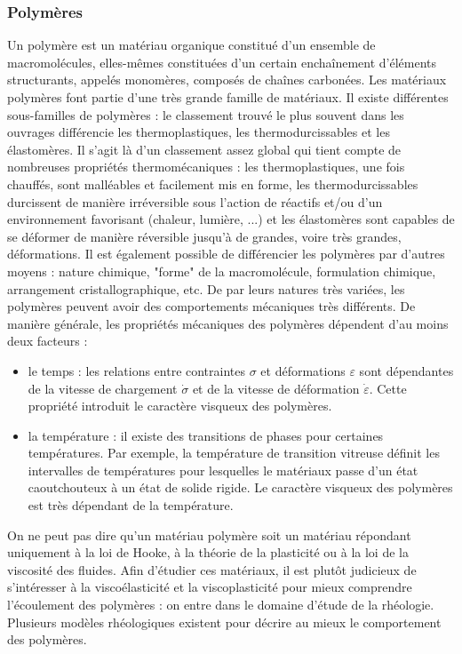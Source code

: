 		\subsubsection{Polymères}
		Un polymère est un matériau organique constitué d'un ensemble de macromolécules, elles-mêmes constituées d'un certain enchaînement d'éléments structurants, appelés monomères, composés de chaînes carbonées. Les matériaux polymères font partie d'une très grande famille de matériaux. Il existe différentes sous-familles de polymères : le classement trouvé le plus souvent dans les ouvrages différencie les thermoplastiques, les thermodurcissables et les élastomères. Il s'agit là d'un classement assez global qui tient compte de nombreuses propriétés thermomécaniques : les thermoplastiques, une fois chauffés, sont malléables et facilement mis en forme, les thermodurcissables durcissent de manière irréversible sous l'action de réactifs et/ou d'un environnement favorisant (chaleur, lumière, ...) et les élastomères sont capables de se déformer de manière réversible jusqu'à de grandes, voire très grandes, déformations. Il est également possible de différencier les polymères par d'autres moyens : nature chimique, "forme" de la macromolécule, formulation chimique, arrangement cristallographique, etc. De par leurs natures très variées, les polymères peuvent avoir des comportements mécaniques très différents. De manière générale, les propriétés mécaniques des polymères dépendent d'au moins deux facteurs :
		\begin{itemize}
			\item le temps : les relations entre contraintes $\sigma$ et déformations $\varepsilon$ sont dépendantes de la vitesse de chargement $\dot{\sigma}$ et de la vitesse de déformation $\dot{\varepsilon}$. Cette propriété introduit le caractère visqueux des polymères.
			\item la température : il existe des transitions de phases pour certaines températures. Par exemple, la température de transition vitreuse définit les intervalles de températures pour lesquelles le matériaux passe d'un état caoutchouteux à un état de solide rigide. Le caractère visqueux des polymères est très dépendant de la température.
		\end{itemize}
		On ne peut pas dire qu'un matériau polymère soit un matériau répondant uniquement à la loi de Hooke, à la théorie de la plasticité ou à la loi de la viscosité des fluides. Afin d'étudier ces matériaux, il est plutôt judicieux de s'intéresser à la viscoélasticité et la viscoplasticité pour mieux comprendre l'écoulement des polymères : on entre dans le domaine d'étude de la rhéologie. Plusieurs modèles rhéologiques existent pour décrire au mieux le comportement des polymères.
